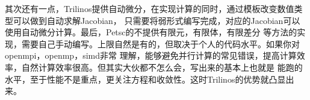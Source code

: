 \documentclass[11pt, a4paper]{ctexart}
\theoremstyle{definition}
\theoremstyle{plain}
\begin{document}
其次还有一点，Trilinos提供自动微分，在实现计算的同时，通过模板改变数值类型可以做到自动求解Jacobian，
只需要将弱形式编写完成，对应的Jacobian可以使用自动微分计算。最后，Petsc的不提供有限元，有限体，有限差分
等方法的实现，需要自己手动编写。上限自然是有的，但取决于个人的代码水平。如果你对openmpi，openmp，simd非常
理解，能够避免并行计算的常见错误，提高计算效率，自然计算效率很高。但其实大伙都不怎么会，写出来的基本上也就是
能跑的水平，至于性能不是重点，更关注方程和收敛性。这时Trilinos的优势就凸显出来。








\end{document}
